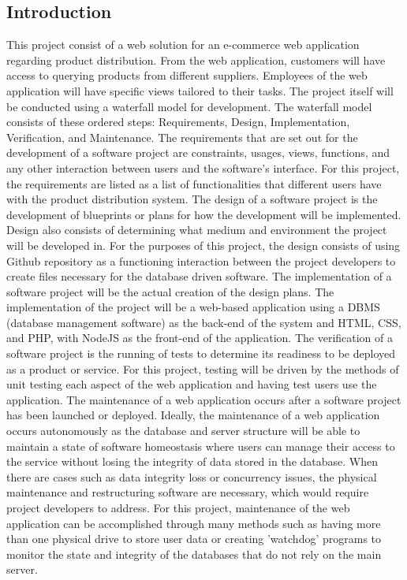 \documentclass[12pt]{article}
\begin{document}
\begin{myspace}{1.7}
        
\section*{Introduction}  
	This project consist of a web solution for an e-commerce web application regarding product distribution. From the web application, customers will have access to querying products from different suppliers. Employees of the web application will have specific views tailored to their tasks. The project itself will be conducted using a waterfall model \cite{waterfall} for development.
	The waterfall model consists of these ordered steps: Requirements, Design, Implementation, Verification, and Maintenance.
	The requirements that are set out for the development of a software project are constraints, usages, views, functions, and any other interaction between users and the software's interface. For this project, the requirements are listed as a list of functionalities that different users have with the product distribution system.
	The design of a software project is the development of blueprints or plans for how the development will be implemented. Design also consists of determining what medium and environment the project will be developed in. For the purposes of this project, the design consists of using Github repository as a functioning interaction between the project developers to create files necessary for the database driven software.
	The implementation of a software project will be the actual creation of the design plans. The implementation of the project will be a web-based application using a DBMS (database management software) as the back-end of the system and HTML, CSS, and PHP, with NodeJS as the front-end of the application.
	The verification of a software project is the running of tests to determine its readiness to be deployed as a product or service. For this project, testing will be driven by the methods of unit testing each aspect of the web application and having test users use the application.
	The maintenance of a web application occurs after a software project has been launched or deployed. Ideally, the maintenance of a web application occurs autonomously as the database and server structure will be able to maintain a state of software homeostasis where users can manage their access to the service without losing the integrity of data stored in the database. When there are cases such as data integrity loss or concurrency issues, the physical maintenance and restructuring software are necessary, which would require project developers to address. For this project, maintenance of the web application can be accomplished through many methods such as having more than one physical drive to store user data or creating 'watchdog' programs to monitor the state and integrity of the databases that do not rely on the main server.
	


\end{myspace}
\end{document}
